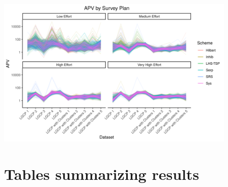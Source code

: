 \documentclass[review]{elsarticle}
\begin{document}
\includegraphics[width=4.5in]{../graphics/APV-profile.png}


\pagebreak
\section{Tables summarizing results}

\end{document}
